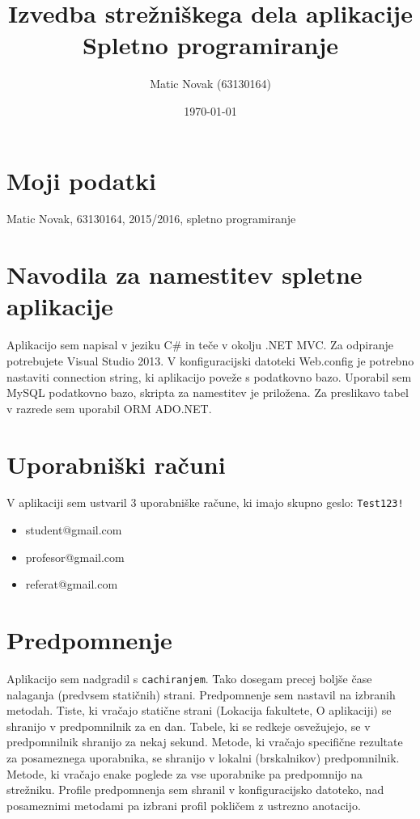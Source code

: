 \documentclass[a4paper,11pt]{article}
\title{Izvedba strežniškega dela aplikacije \\ Spletno programiranje}
\author{Matic Novak (63130164)}
\date{\today}
\begin{document}
\maketitle

\section{Moji podatki}

Matic Novak, 63130164, 2015/2016, spletno programiranje

\section{Navodila za namestitev spletne aplikacije}

Aplikacijo sem napisal v jeziku C\# in teče v okolju .NET MVC. Za odpiranje potrebujete Visual Studio 2013. V konfiguracijski datoteki Web.config je potrebno nastaviti connection string, ki aplikacijo poveže s podatkovno bazo. Uporabil sem MySQL podatkovno bazo, skripta za namestitev je priložena. Za preslikavo tabel v razrede sem uporabil ORM ADO.NET.

\section{Uporabniški računi}

V aplikaciji sem ustvaril 3 uporabniške račune, ki imajo skupno geslo: \texttt{Test123!}
\begin{itemize}
\item student@gmail.com
\item profesor@gmail.com
\item referat@gmail.com
\end{itemize}

\section{Predpomnenje}
Aplikacijo sem nadgradil s \texttt{cachiranjem}. Tako dosegam precej boljše čase nalaganja (predvsem statičnih) strani. Predpomnenje sem nastavil na izbranih metodah. Tiste, ki vračajo statične strani (Lokacija fakultete, O aplikaciji) se shranijo v predpomnilnik za en dan. Tabele, ki se redkeje osvežujejo, se v predpomnilnik shranijo za nekaj sekund. Metode, ki vračajo specifične rezultate za posameznega uporabnika, se shranijo v lokalni (brskalnikov) predpomnilnik. Metode, ki vračajo enake poglede za vse uporabnike pa predpomnijo na strežniku. Profile predpomnenja sem shranil v konfiguracijsko datoteko, nad posameznimi metodami pa izbrani profil pokličem z ustrezno anotacijo.
\end{document}
